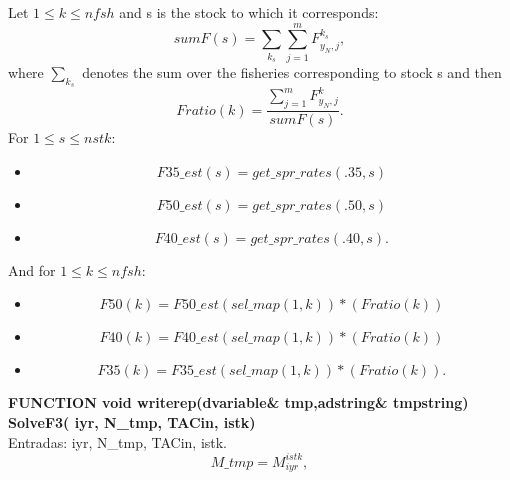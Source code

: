 \documentclass{article}
\begin{document}
Let $1\leq k \leq nfsh$ and s is the stock to which it corresponds:
\begin{equation}
    sumF(s)=\sum_{k_s}\sum_{j=1}^mF^{k_s}_{y_N, j},
\end{equation}
where $\sum_{k_s}$ denotes the sum over the fisheries corresponding to stock s and then
\begin{equation}
    Fratio(k)=\dfrac{\sum_{j=1}^mF^k_{y_N,j}}{sumF(s)}.
\end{equation}
For $1\leq s \leq nstk$:
\begin{itemize}
    \item \begin{equation}
        F35\_est(s) = get\_spr\_rates(.35,s)
    \end{equation}
    \item \begin{equation}
        F50\_est(s) = get\_spr\_rates(.50,s)
    \end{equation}
    \item \begin{equation}
        F40\_est(s) = get\_spr\_rates(.40,s).
    \end{equation}
\end{itemize}
And for $1\leq k \leq nfsh$:
\begin{itemize}
    \item \begin{equation}
        F50(k) = F50\_est(sel\_map(1,k)) * (Fratio(k))
    \end{equation}
    \item \begin{equation}
        F40(k) = F40\_est(sel\_map(1,k)) * (Fratio(k))
    \end{equation}
    \item \begin{equation}
        F35(k) = F35\_est(sel\_map(1,k)) * (Fratio(k)).
    \end{equation}
\end{itemize}

\textbf{FUNCTION void writerep(dvariable\& tmp,adstring\& tmpstring)}\\


\textbf{SolveF3( iyr, N\_tmp,  TACin, istk)}\\

Entradas:  iyr, N\_tmp,  TACin, istk.
\begin{equation}
    M\_tmp=M^{istk}_{iyr},
\end{equation}
\end{document}
